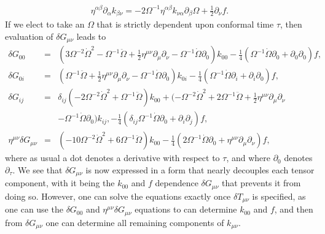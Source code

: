 %
\begin{eqnarray}
\eta^{\alpha\beta}\partial_{\alpha}k_{\beta\nu} = -2 \Omega^{-1}  \eta^{\alpha\beta}k_{\nu\alpha}\partial_\beta \Omega + \tfrac{1}{2} \partial_\nu f.
\label{D3}
\end{eqnarray}
%
If we elect to take an $\Omega$  that is strictly dependent upon conformal time $\tau$, then evaluation of $\delta G_{\mu\nu}$ leads to
%
\begin{eqnarray}
\delta G_{00}&=&
(3 \Omega^{-2} \dot{\Omega}^2 -  \Omega^{-1} \ddot{\Omega} + \tfrac{1}{2} \eta^{\mu \nu} \partial_{\mu} \partial_{\nu} -  \Omega^{-1} \dot{\Omega} \partial_{0}) k_{00} - \tfrac{1}{4} ( \Omega^{-1} \dot{\Omega} \partial_{0} + \partial_{0} \partial_{0}) f,
\nonumber\\
\delta G_{0i}&=&
(\Omega^{-1} \ddot{\Omega} + \tfrac{1}{2} \eta^{\mu \nu} \partial_{\mu} \partial_{\nu} -  \Omega^{-1} \dot{\Omega} \partial_{0}) k_{0i} - \tfrac{1}{4}  (\Omega^{-1} \dot{\Omega} \partial_{i} +\partial_{i} \partial_{0}) f,
\nonumber\\
\delta G_{ij}&=&
\delta_{ij}(-2 \Omega^{-2} \dot{\Omega}^2 + \Omega^{-1} \ddot{\Omega}) k_{00} + (- \Omega^{-2} \dot{\Omega}^2 + 2 \Omega^{-1} \ddot{\Omega} + \tfrac{1}{2} \eta^{\mu \nu} \partial_{\mu} \partial_{\nu}  
\nonumber\\
&&-  \Omega^{-1} \dot{\Omega} \partial_{0}) k_{ij}, 
- \tfrac{1}{4} (\delta_{ij} \Omega^{-1} \dot{\Omega} \partial_{0} + \partial_{i} \partial_{j}) f,
\nonumber\\
\eta^{\mu\nu}\delta G_{\mu\nu}&=&(-10\Omega^{-2} \dot{\Omega}^2 +6  \Omega^{-1} \ddot{\Omega})k_{00}- \tfrac{1}{4}  (2\Omega^{-1} \dot{\Omega} \partial_{0} +\eta^{\mu\nu}\partial_{\mu}\partial_{\nu}) f,
\label{D4}
\end{eqnarray}
%
where as usual a dot denotes a derivative with respect to $\tau$, and where $\partial_0$ denotes $\partial_{\tau}$. We see that $\delta G_{\mu\nu}$ is now expressed in a form that nearly decouples each tensor component, with it being the $k_{00}$ and $f$ dependence  $\delta G_{\mu\nu}$ that prevents it from doing so. However, one can solve the equations exactly once $\delta T_{\mu\nu}$ is specified, as one can use the $\delta G_{00}$ and $\eta^{\mu\nu}\delta G_{\mu\nu}$ equations to can determine $k_{00}$ and $f$, and then from $\delta G_{\mu\nu}$ one can determine all remaining components of $k_{\mu\nu}$. 


